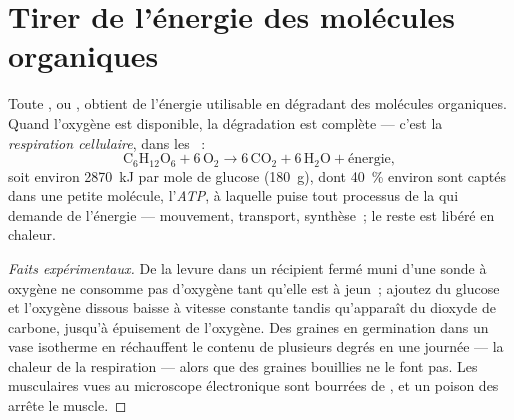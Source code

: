 \section{Tirer de l'énergie des molécules organiques}

\begin{proposition}\label{prop:g10:cell-metabolism:respiration}
Toute ,  ou , obtient de l'énergie
utilisable en dégradant des molécules organiques. Quand l'oxygène est
disponible, la dégradation est complète --- c'est la
\emph{respiration cellulaire}, dans les
~:
\[
\mathrm{C_6H_{12}O_6} + 6\,\mathrm{O_2} \longrightarrow
6\,\mathrm{CO_2} + 6\,\mathrm{H_2O} + \text{énergie},
\]
soit environ \qty{2870}{kJ} par mole de glucose (\qty{180}{g}), dont
40~\% environ sont captés dans une petite molécule,
l'\emph{ATP}, à laquelle puise tout processus de la 
qui demande de l'énergie --- mouvement, transport, synthèse~; le reste
est libéré en chaleur.
\end{proposition}
\begin{proof}[Faits expérimentaux]
De la levure dans un récipient fermé muni d'une sonde à oxygène ne
consomme pas d'oxygène tant qu'elle est à jeun~; ajoutez du glucose et
l'oxygène dissous baisse à vitesse constante tandis qu'apparaît du
dioxyde de carbone, jusqu'à épuisement de l'oxygène. Des graines en
germination dans un vase isotherme en réchauffent le contenu de
plusieurs degrés en une journée --- la chaleur de la respiration ---
alors que des graines bouillies ne le font pas. Les 
musculaires vues au microscope électronique sont bourrées de
, et un poison des  arrête le muscle.
\end{proof}

